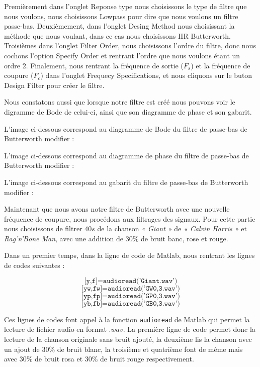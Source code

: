 \documentclass[conference,onecolumn]{IEEEtran}
\begin{document}
Premièrement dans l'onglet Reponse type nous choisissons le type de filtre que nous voulons, nous choisissons Lowpass pour dire que nous voulons un filtre passe-bas. Deuxièmement, dans l'onglet Desing Method nous choisissant la méthode que nous voulant, dans ce cas nous choisissons IIR Butterworth. Troisièmes dans l'onglet Filter Order, nous choisissons l'ordre du filtre, donc nous cochons l'option Specify Order et rentrant l'ordre que nous voulons étant un ordre 2. Finalement, nous rentrant la fréquence de sortie ($F_s$) et la fréquence de coupure ($F_c$) dans l'onglet Frequecy Specifications, et nous cliquons sur le buton Design Filter pour créer le filtre. 

Nous constatons aussi que lorsque notre filtre est créé nous pouvons voir le digramme de Bode de celui-ci, ainsi que son diagramme de phase et son gabarit. 

L'image ci-dessous correspond au diagramme de Bode du filtre de passe-bas de Butterworth modifier :


L'image ci-dessous correspond au diagramme de phase du filtre de passe-bas de Butterworth modifier :


L'image ci-dessous correspond au gabarit du filtre de passe-bas de Butterworth modifier :



Maintenant que nous avons notre filtre de Butterworth avec une nouvelle fréquence de coupure, nous procédons aux filtrages des signaux. Pour cette partie nous choisissons de filtrer $40s$ de la chanson \textit{« Giant »} de \textit{« Calvin Harris »} et \textit{Rag'n'Bone Man}, avec une addition de 30\% de bruit banc, rose et rouge.

Dans un premier temps, dans la ligne de code de Matlab, nous rentrant les lignes de codes suivantes :

\[ \texttt{[y,f]=audioread('Giant.wav')}\]
\[ \texttt{[yw,fw]=audioread('GW0,3.wav')}\]
\[ \texttt{[yp,fp]=audioread('GP0,3.wav')}\]
\[ \texttt{[yb,fb]=audioread('GB0,3.wav')}\]

Ces lignes de codes font appel à la fonction \texttt{audioread} de Matlab qui permet la lecture de fichier audio en format $.wav$. La première ligne de code permet donc la lecture de la chanson originale sans bruit ajouté, la deuxième lis la chanson avec un ajout de 30\% de bruit blanc, la troisième et quatrième font de même mais avec 30\% de bruit rosa et 30\% de bruit rouge respectivement.
\end{document}
